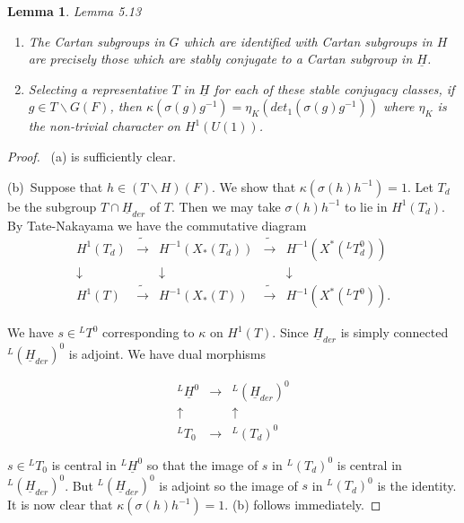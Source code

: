 \documentclass{memo-l}
\newtheorem{lemma}[theorem]{Lemma}
\theoremstyle{definition}
\theoremstyle{remark}
\numberwithin{section}{chapter}
\numberwithin{equation}{chapter}
\begin{document}
\medskip


\begin{lemma}{Lemma 5.13}
\begin{enumerate}[label=\alph*)]
\item The Cartan subgroups in $G$ which are identified with 
Cartan subgroups
in $H$ are precisely those which are stably conjugate to a Cartan subgroup
in $\underline{H}$.
\item Selecting a representative $T$ in $\underline{H}$ for each of these stable
conjugacy classes, if $g  \in  T\backslash G(F)$, then
${\kappa}({\sigma}(g)g^{-1})  =  {\eta}_{K}(det_{1}({\sigma}(g)g^{-1}))$
where ${\eta}_{K}$ is the non-trivial character on $H^{1}(U(1))$.
\end{enumerate}
\end{lemma}


\begin{proof} \ (a) is sufficiently clear.

(b)\ Suppose that $h  \in  (T\backslash H)(F)$.  We show that
${\kappa}({\sigma}(h)h^{-1})  = 1$.  Let $T_{d}$ be the subgroup $T {\cap}
\underline{H}_{der}$ of $T$.  Then we may take ${\sigma}(h)h^{-1}$ to lie in
$H^{1}(T_{d})$.  By Tate-Nakayama we have the commutative diagram
$$
\begin{matrix} 
H^{1}(T_{d}) & \tilde{\to} & H^{-1}(X_{*}(T_{d})) & \tilde{\to}	&
H^{-1}(X^{*}(^{L}T_{d}^{0})) \\
\downarrow && \downarrow && \downarrow \\
H^{1}(T) & \tilde{\to} & H^{-1}(X_{*}(T)) & \tilde{\to}	&
H^{-1}(X^{*}(^{L}T^{0}))   .
\end{matrix}
$$

\noindent
We have $s  \in {}^{L}T^{0}$ corresponding to ${\kappa}$ on $H^{1}(T)$.
Since $\underline{H}_{der}$ is simply connected ${}^{L}(\underline{H}_{der})^{0}$ is
adjoint.  We have dual morphisms

$$
\begin{matrix} 
         ^{L}\underline{H}^{0} & \to & {}^{L}(\underline{H}_{der})^{0}\\
	 \uparrow && \uparrow \\
         ^{L}T_{0} &\to & {}^{L}(T_{d})^{0}
	 \end{matrix}
$$


$s  \in  {}^{L}T_{0}$ is central in $^{L}\underline{H}^{0}$ so that the image of
$s$ in $^{L}(T_{d})^{0}$ is central in $^{L}(\underline{H}_{der})^{0}$.  But
$^{L}(\underline{H}_{der})^{0}$ is adjoint so the image of $s$ in
${}^{L}(T_{d})^{0}$ is the identity.  It is now clear that
${\kappa}({\sigma}(h)h^{-1})  =  1$.  (b) follows immediately.
\end{proof}
{\medskip}
\end{document}
